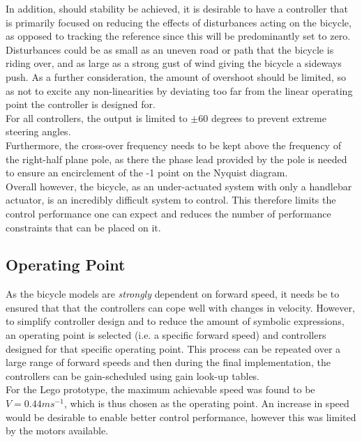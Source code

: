 In addition, should stability be achieved, it is desirable to have a controller that is primarily focused on reducing the effects of disturbances acting on the bicycle, as opposed to tracking the reference since this will be predominantly set to zero. Disturbances could be as small as an uneven road or path that the bicycle is riding over, and as large as a strong gust of wind giving the bicycle a sideways push. As a further consideration, the amount of overshoot should be limited, so as not to excite any non-linearities by deviating too far from the linear operating point the controller is designed for. \\

For all controllers, the output is limited to $\pm 60$ degrees to prevent extreme steering angles. \\

Furthermore, the cross-over frequency needs to be kept above the frequency of the right-half plane pole, as there the phase lead provided by the pole is needed to ensure an encirclement of the -1 point on the Nyquist diagram. \\

Overall however, the bicycle, as an under-actuated system with only a handlebar actuator, is an incredibly difficult system to control. This therefore limits the control performance one can expect and reduces the number of performance constraints that can be placed on it.

\subsection{Operating Point}
As the bicycle models are \textit{strongly} dependent on forward speed, it needs be to ensured that that the controllers can cope well with changes in velocity. However, to simplify controller design and to reduce the amount of symbolic expressions, an operating point is selected (i.e. a specific forward speed) and controllers designed for that specific operating point. This process can be repeated over a large range of forward speeds and then during the final implementation, the controllers can be gain-scheduled using gain look-up tables. \\

For the Lego prototype, the maximum achievable speed was found to be $V=0.44ms^{-1}$, which is thus chosen as the operating point. An increase in speed would be desirable to enable better control performance, however this was limited by the motors available. \\

